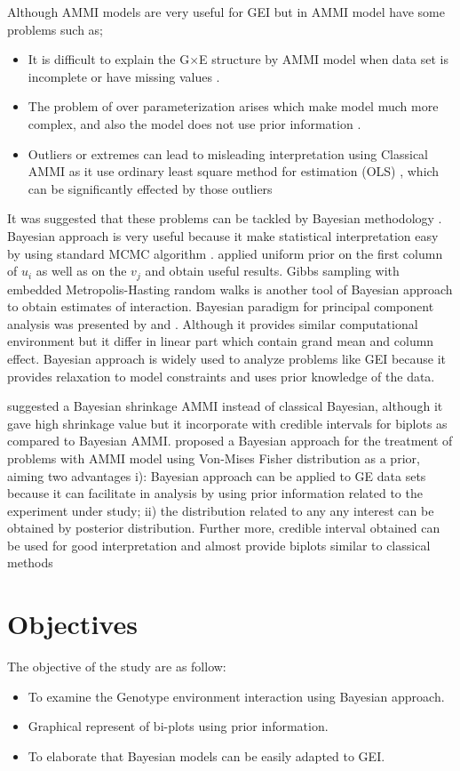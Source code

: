 Although AMMI models are very useful for GEI but in AMMI model have some problems such as; 
\begin{itemize}
	
\item It is difficult to explain the G$\times$E  structure by AMMI model when data set is incomplete or have missing values \citep{PEREZ-ELIZALDE2011}.
\item The problem of over parameterization arises which make model much more complex, and  also the model does not use prior information \citep{JOSSE2014}.
\item  Outliers or extremes can lead to misleading interpretation using Classical AMMI as it use ordinary least square method for estimation (OLS) , which can be significantly effected by those outliers \citep{Rodrigues2015} 
\end{itemize}
It was suggested that these problems can be tackled by Bayesian methodology . Bayesian approach is very useful because it make statistical interpretation easy by using standard MCMC algorithm \citep{Gelman2004}. \citet{Viele2000} applied uniform prior on the first column of $u_i$ as well as on the $v_j$ and obtain useful results. Gibbs sampling with embedded Metropolis-Hasting random walks is another tool of Bayesian approach to obtain estimates of interaction. Bayesian paradigm for principal component analysis was presented by \citet{Hoff2007} and \citet{Simdl2007}. Although it provides similar computational environment but it differ in linear part which contain grand mean and column effect. Bayesian approach is widely used to analyze problems like GEI because it provides relaxation to model constraints and uses prior knowledge of the data.

\citet{Silva2015} suggested a Bayesian shrinkage AMMI  instead of classical Bayesian, although it gave high shrinkage value but it incorporate with credible intervals for biplots as compared to Bayesian AMMI. \citet{PEREZ-ELIZALDE2011} proposed a Bayesian approach for the treatment of problems with AMMI model using Von-Mises Fisher distribution as a prior, aiming two advantages i): Bayesian approach can be applied to GE data sets because it can facilitate in analysis by using prior information related to the experiment under study; ii) the distribution related to any any interest can be obtained by posterior distribution. Further more, credible interval obtained can be used for good interpretation and almost provide biplots similar to classical methods 
\section{Objectives} 
The objective of the study are as follow:
\begin{itemize}
	
\item To examine the Genotype environment interaction using Bayesian approach.
\item Graphical represent of bi-plots using prior information.
\item To elaborate that Bayesian models can be easily adapted to GEI.
\end{itemize}

